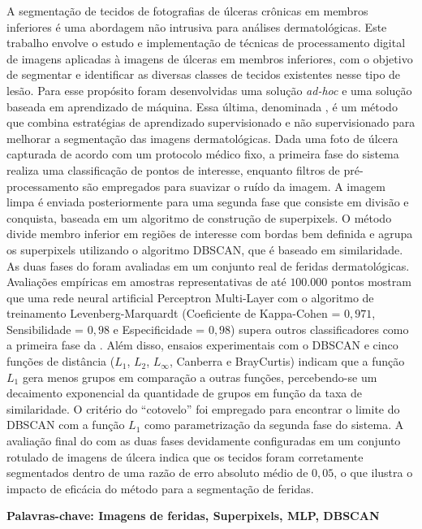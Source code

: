 \noindent 
A segmentação de tecidos de fotografias de úlceras crônicas em membros inferiores é uma abordagem não intrusiva para análises dermatológicas.
Este trabalho envolve o estudo e implementação de técnicas de processamento digital de imagens aplicadas à imagens de úlceras em membros inferiores, com o objetivo de segmentar e identificar as diversas classes de tecidos existentes nesse tipo de lesão.
Para esse propósito foram desenvolvidas uma solução \textit{ad-hoc} e uma solução baseada em aprendizado de máquina.
Essa última, denominada \system, é um método que combina estratégias de aprendizado supervisionado e não supervisionado para melhorar a segmentação das imagens dermatológicas.
Dada uma foto de úlcera capturada de acordo com um protocolo médico fixo, a primeira fase do sistema realiza uma classificação de pontos de interesse, enquanto filtros de pré-processamento são empregados para suavizar o ruído da imagem.
A imagem limpa é enviada posteriormente para uma segunda fase que consiste em divisão e conquista, baseada em um algoritmo de construção de superpixels.
O método \system divide membro inferior em regiões de interesse com bordas bem definida e agrupa os superpixels utilizando o algoritmo DBSCAN, que é baseado em similaridade.
As duas fases do \system foram avaliadas em um conjunto real de feridas dermatológicas. 
Avaliações empíricas em amostras representativas de até $ 100.000$ pontos mostram que uma rede neural artificial Perceptron Multi-Layer com o algoritmo de treinamento Levenberg-Marquardt (Coeficiente de Kappa-Cohen = $ 0,971 $, Sensibilidade = $ 0,98 $ e Especificidade = $ 0,98 $) supera outros classificadores como a primeira fase da \system.
Além disso, ensaios experimentais com o DBSCAN e cinco funções de distância ($ L_1 $, $ L_2 $, $ L_ \infty $, Canberra e BrayCurtis) indicam que a função $ L_1 $ gera menos grupos em comparação a outras funções, percebendo-se um decaimento exponencial da quantidade de grupos em função da taxa de similaridade.
O critério do ``cotovelo'' foi empregado para encontrar o limite do DBSCAN com a função $ L_1 $ como parametrização da segunda fase do sistema.
A avaliação final do \system com as duas fases devidamente configuradas em um conjunto rotulado de imagens de úlcera indica que os tecidos foram corretamente segmentados dentro de uma razão de erro absoluto médio de $0,05$, o que ilustra o impacto de eficácia do método \system para a segmentação de feridas.

\vspace{1cm}

\noindent \textbf{Palavras-chave: Imagens de feridas, Superpixels, MLP, DBSCAN }

